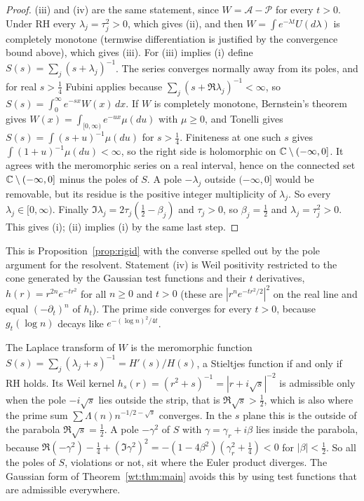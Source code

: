\begin{proof}
(iii) and (iv) are the same statement, since $W=\mathcal A-\mathcal P$ for every $t>0$. Under RH every $\lambda_j=\tau_j^2>0$, which gives (ii), and then $W=\int e^{-\lambda t}U(d\lambda)$ is completely monotone (termwise differentiation is justified by the convergence bound above), which gives (iii). For (iii) implies (i) define $S(s)=\sum_j(s+\lambda_j)^{-1}$. The series converges normally away from its poles, and for real $s>\frac14$ Fubini applies because $\sum_j(s+\Re\lambda_j)^{-1}<\infty$, so $S(s)=\int_0^\infty e^{-sx}W(x)\,dx$. If $W$ is completely monotone, Bernstein's theorem gives $W(x)=\int_{[0,\infty)}e^{-ux}\mu(du)$ with $\mu\ge0$, and Tonelli gives $S(s)=\int(s+u)^{-1}\mu(du)$ for $s>\frac14$. Finiteness at one such $s$ gives $\int(1+u)^{-1}\mu(du)<\infty$, so the right side is holomorphic on $\mathbb{C}\setminus(-\infty,0]$. It agrees with the meromorphic series on a real interval, hence on the connected set $\mathbb{C}\setminus(-\infty,0]$ minus the poles of $S$. A pole $-\lambda_j$ outside $(-\infty,0]$ would be removable, but its residue is the positive integer multiplicity of $\lambda_j$. So every $\lambda_j\in[0,\infty)$. Finally $\Im\lambda_j=2\tau_j(\frac12-\beta_j)$ and $\tau_j>0$, so $\beta_j=\frac12$ and $\lambda_j=\tau_j^2>0$. This gives (i); (ii) implies (i) by the same last step.
\end{proof}

This is Proposition~\ref{prop:rigid} with the converse spelled out by the pole argument for the resolvent. Statement (iv) is Weil positivity restricted to the cone generated by the Gaussian test functions and their $t$ derivatives, $h(r)=r^{2n}e^{-tr^2}$ for all $n\ge0$ and $t>0$ (these are $|r^ne^{-tr^2/2}|^2$ on the real line and equal $(-\partial_t)^n$ of $h_t$). The prime side converges for every $t>0$, because $g_t(\log n)$ decays like $e^{-(\log n)^2/4t}$.

\begin{remark}
The Laplace transform of $W$ is the meromorphic function $S(s)=\sum_j(\lambda_j+s)^{-1}=H'(s)/H(s)$, a Stieltjes function if and only if RH holds. Its Weil kernel $h_s(r)=(r^2+s)^{-1}=|r+i\sqrt s|^{-2}$ is admissible only when the pole $-i\sqrt s$ lies outside the strip, that is $\Re\sqrt s>\frac12$, which is also where the prime sum $\sum\Lambda(n)n^{-1/2-\sqrt s}$ converges. In the $s$ plane this is the outside of the parabola $\Re\sqrt s=\frac12$. A pole $-\gamma^2$ of $S$ with $\gamma=\gamma_r+i\beta$ lies inside the parabola, because $\Re(-\gamma^2)-\frac14+(\Im\gamma^2)^2=-(1-4\beta^2)(\gamma_r^2+\frac14)<0$ for $|\beta|<\frac12$. So all the poles of $S$, violations or not, sit where the Euler product diverges. The Gaussian form of Theorem~\ref{wt:thm:main} avoids this by using test functions that are admissible everywhere.
\end{remark}

